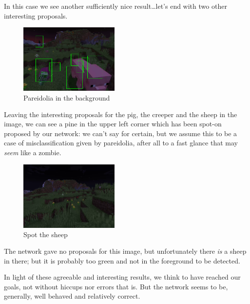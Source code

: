 \documentclass[10pt,journal,cspaper,compsoc]{IEEEtran}
\begin{document}
    In this case we see another sufficiently nice result\dots let's end with two other interesting proposals.

    \begin{figure}[h]
        \centering
        \includegraphics[width=0.44\textwidth]{images/pine.png}
        \caption{Pareidolia in the background}
    \end{figure}

    Leaving the interesting proposals for the pig, the creeper and the sheep in the image, we can see a pine in the upper left corner which has been spot-on proposed by our network: we can't say for certain, but we assume this to be a case of misclassification given by pareidolia, after all to a fast glance that may \emph{seem} like a zombie.

    \newpage
    \begin{figure}[h]
        \centering
        \includegraphics[width=0.44\textwidth]{images/spot_sheep.png}
        \caption{Spot the sheep}
    \end{figure}

    The network gave no proposals for this image, but unfortunately there \emph{is} a sheep in there; but it is probably too green and not in the foreground to be detected.

    In light of these agreeable and interesting results, we think to have reached our goals, not without hiccups nor errors that is. But the network seems to be, generally, well behaved and relatively correct.



    
    
\end{document}
